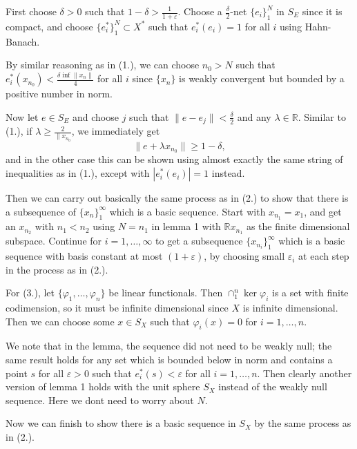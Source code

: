 \documentclass[11pt, reqno]{article}
\theoremstyle{plain}
\theoremstyle{definition}
\theoremstyle{remark}
\renewcommand{\phi}{\varphi}
\renewcommand{\epsilon}{\varepsilon}
\newcommand{\RR}{\mathbb{R}}
\begin{document}
\begin{enumerate}
    First choose $\delta > 0$ such that $1 - \delta > \frac{1}{1 + \epsilon}$. Choose a $\frac{\delta}{2}$-net
    $\{e_i\}_1^N$ in $S_E$ since it is compact, and choose $\{e_i^*\}_1^N \subset X^*$ such that
    $e_i^*(e_i) = 1$ for all $i$ using Hahn-Banach. 

    By similar reasoning as in (1.), we can choose $n_0 > N$ such that $e_i^*(x_{n_0}) < \frac{\delta \inf \|x_n\|}{4}$
    for all $i$ since $\{x_n\}$ is weakly convergent but bounded by a positive number in norm. 

    Now let $e \in S_E$ and choose $j$ such that $\|e - e_j\| < \frac{\delta}{2}$ and any $\lambda \in \RR$. 
    Similar to (1.), if $\lambda \geq \frac{2}{\|x_{n_0}}$, we immediately get
    \[  
        \|e + \lambda x_{n_0}\| \geq 1 - \delta,
    \]
    and in the other case this can be shown using almost exactly the same string of inequalities as in (1.),
    except with $|e_i^*(e_i)| = 1$ instead.

    Then we can carry out basically the same process as in (2.) to show that there is a subsequence of $\{x_n\}_1^\infty$
    which is a basic sequence. Start with $x_{n_1} = x_1$, and get an $x_{n_2}$ with $n_1 < n_2$ using $N = n_1$
    in lemma 1 with $\RR x_{n_1}$ as the finite dimensional subspace. Continue for $i = 1, \dots, \infty$
    to get a subsequence $\{x_{n_i}\}_1^\infty$ which is a basic sequence with basis constant at most $(1 + \epsilon)$,
    by choosing small $\epsilon_i$ at each step in the process as in (2.). 

    For (3.), let $\{\phi_1, \dots, \phi_n\}$ be linear functionals. Then $\cap_1^n \ker \phi_i$ is a set 
    with finite codimension, so it must be infinite dimensional since $X$ is infinite dimensional. Then 
    we can choose some $x \in S_X$ such that $\phi_i(x) = 0$ for $i = 1,\dots, n$. 

    We note that in the lemma, the sequence did not need to be weakly null; the same result holds for
    any set which is bounded below in norm and contains a point $s$ for all $\epsilon > 0$ such that 
    $e_i^*(s) < \epsilon$ for all $i = 1, \dots, n$. Then clearly another version of lemma 1 holds 
    with the unit sphere $S_X$ instead of the weakly null sequence. Here we dont need to worry about 
    $N$. 

    Now we can finish to show there is a basic sequence in $S_X$ by the same process as in (2.).

\end{enumerate}
\end{document}
